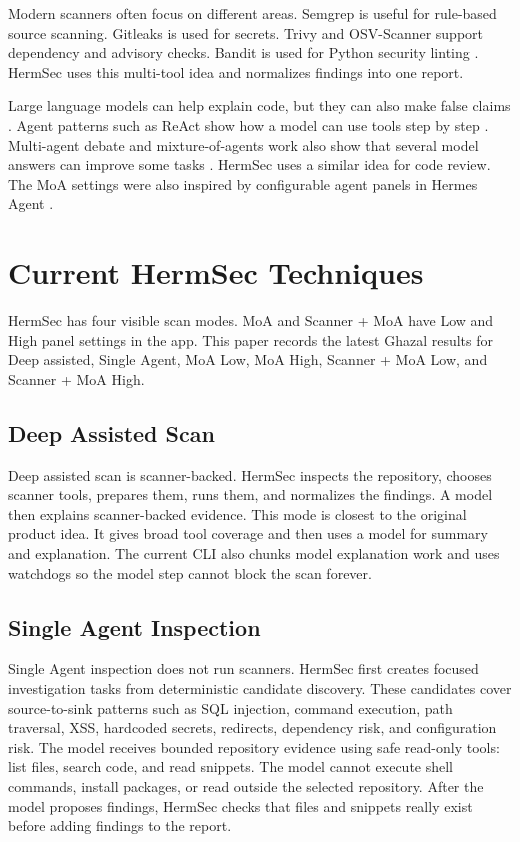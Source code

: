 \documentclass[sigconf,nonacm]{acmart}
\begin{document}
Modern scanners often focus on different areas. Semgrep is useful for rule-based source scanning. Gitleaks is used for secrets. Trivy and OSV-Scanner support dependency and advisory checks. Bandit is used for Python security linting \cite{semgrep,gitleaks,trivy,bandit,osvscanner}. HermSec uses this multi-tool idea and normalizes findings into one report.

Large language models can help explain code, but they can also make false claims \cite{pearce2022asleep}. Agent patterns such as ReAct show how a model can use tools step by step \cite{yao2023react}. Multi-agent debate and mixture-of-agents work also show that several model answers can improve some tasks \cite{du2023debate,wang2024moa}. HermSec uses a similar idea for code review. The MoA settings were also inspired by configurable agent panels in Hermes Agent \cite{nous2026hermesagent}.

\section{Current HermSec Techniques}
HermSec has four visible scan modes. MoA and Scanner + MoA have Low and High panel settings in the app. This paper records the latest Ghazal results for Deep assisted, Single Agent, MoA Low, MoA High, Scanner + MoA Low, and Scanner + MoA High.

\subsection{Deep Assisted Scan}
Deep assisted scan is scanner-backed. HermSec inspects the repository, chooses scanner tools, prepares them, runs them, and normalizes the findings. A model then explains scanner-backed evidence. This mode is closest to the original product idea. It gives broad tool coverage and then uses a model for summary and explanation. The current CLI also chunks model explanation work and uses watchdogs so the model step cannot block the scan forever.

\subsection{Single Agent Inspection}
Single Agent inspection does not run scanners. HermSec first creates focused investigation tasks from deterministic candidate discovery. These candidates cover source-to-sink patterns such as SQL injection, command execution, path traversal, XSS, hardcoded secrets, redirects, dependency risk, and configuration risk. The model receives bounded repository evidence using safe read-only tools: list files, search code, and read snippets. The model cannot execute shell commands, install packages, or read outside the selected repository. After the model proposes findings, HermSec checks that files and snippets really exist before adding findings to the report.
\end{document}
